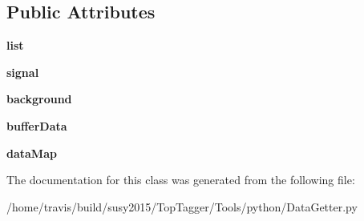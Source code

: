 \subsection*{Public Attributes}
\begin{DoxyCompactItemize}
\item 
\hypertarget{classDataGetter_1_1DataGetter_a2739938ac344ad65b1d2e25e2c787419}{{\bfseries list}}\label{classDataGetter_1_1DataGetter_a2739938ac344ad65b1d2e25e2c787419}

\item 
\hypertarget{classDataGetter_1_1DataGetter_a7e7816b063af6cb91da3d8aa8d48fc2b}{{\bfseries signal}}\label{classDataGetter_1_1DataGetter_a7e7816b063af6cb91da3d8aa8d48fc2b}

\item 
\hypertarget{classDataGetter_1_1DataGetter_ab04199c95788aae9665d4c1b2677b6eb}{{\bfseries background}}\label{classDataGetter_1_1DataGetter_ab04199c95788aae9665d4c1b2677b6eb}

\item 
\hypertarget{classDataGetter_1_1DataGetter_a9d4f5ce1a7aae31b19aa9171cb0b62ac}{{\bfseries buffer\-Data}}\label{classDataGetter_1_1DataGetter_a9d4f5ce1a7aae31b19aa9171cb0b62ac}

\item 
\hypertarget{classDataGetter_1_1DataGetter_ad47a039976844990578f9b9d5e2301c3}{{\bfseries data\-Map}}\label{classDataGetter_1_1DataGetter_ad47a039976844990578f9b9d5e2301c3}

\end{DoxyCompactItemize}


The documentation for this class was generated from the following file\-:\begin{DoxyCompactItemize}
\item 
/home/travis/build/susy2015/\-Top\-Tagger/\-Tools/python/Data\-Getter.\-py\end{DoxyCompactItemize}
